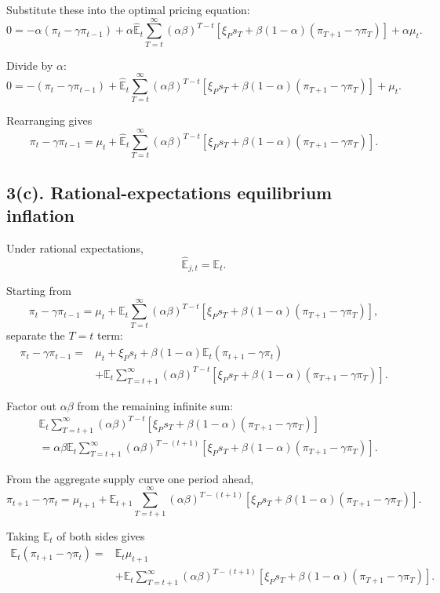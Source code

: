 \documentclass[12pt]{article}
\begin{document}
Substitute these into the optimal pricing equation:
\[
0
=
-\alpha(\pi_t-\gamma\pi_{t-1})
+
\alpha\hat{\mathbb{E}}_{t}
\sum_{T=t}^{\infty}
(\alpha\beta)^{T-t}
\left[
\xi_P s_T
+
\beta(1-\alpha)(\pi_{T+1}-\gamma\pi_T)
\right]
+
\alpha\mu_t.
\]

Divide by $\alpha$:
\[
0
=
-(\pi_t-\gamma\pi_{t-1})
+
\hat{\mathbb{E}}_{t}
\sum_{T=t}^{\infty}
(\alpha\beta)^{T-t}
\left[
\xi_P s_T
+
\beta(1-\alpha)(\pi_{T+1}-\gamma\pi_T)
\right]
+
\mu_t.
\]

Rearranging gives
\[
\boxed{
\pi_t-\gamma\pi_{t-1}
=
\mu_t
+
\hat{\mathbb{E}}_{t}
\sum_{T=t}^{\infty}
(\alpha\beta)^{T-t}
\left[
\xi_P s_T
+
\beta(1-\alpha)(\pi_{T+1}-\gamma\pi_T)
\right].
}
\]

\subsection*{3(c). Rational-expectations equilibrium inflation}

Under rational expectations,
\[
\hat{\mathbb{E}}_{j,t}=\mathbb{E}_t.
\]

Starting from
\[
\pi_t-\gamma\pi_{t-1}
=
\mu_t
+
\mathbb{E}_{t}
\sum_{T=t}^{\infty}
(\alpha\beta)^{T-t}
\left[
\xi_P s_T
+
\beta(1-\alpha)(\pi_{T+1}-\gamma\pi_T)
\right],
\]
separate the $T=t$ term:
\[
\begin{aligned}
\pi_t-\gamma\pi_{t-1}
=
&\mu_t
+
\xi_P s_t
+
\beta(1-\alpha)\mathbb{E}_t(\pi_{t+1}-\gamma\pi_t) \\
&+
\mathbb{E}_{t}
\sum_{T=t+1}^{\infty}
(\alpha\beta)^{T-t}
\left[
\xi_P s_T
+
\beta(1-\alpha)(\pi_{T+1}-\gamma\pi_T)
\right].
\end{aligned}
\]

Factor out $\alpha\beta$ from the remaining infinite sum:
\[
\begin{aligned}
&\mathbb{E}_{t}
\sum_{T=t+1}^{\infty}
(\alpha\beta)^{T-t}
\left[
\xi_P s_T
+
\beta(1-\alpha)(\pi_{T+1}-\gamma\pi_T)
\right] \\
&=
\alpha\beta
\mathbb{E}_{t}
\sum_{T=t+1}^{\infty}
(\alpha\beta)^{T-(t+1)}
\left[
\xi_P s_T
+
\beta(1-\alpha)(\pi_{T+1}-\gamma\pi_T)
\right].
\end{aligned}
\]

From the aggregate supply curve one period ahead,
\[
\pi_{t+1}-\gamma\pi_t
=
\mu_{t+1}
+
\mathbb{E}_{t+1}
\sum_{T=t+1}^{\infty}
(\alpha\beta)^{T-(t+1)}
\left[
\xi_P s_T
+
\beta(1-\alpha)(\pi_{T+1}-\gamma\pi_T)
\right].
\]

Taking $\mathbb{E}_t$ of both sides gives
\[
\begin{aligned}
\mathbb{E}_t(\pi_{t+1}-\gamma\pi_t)
=
&\mathbb{E}_t\mu_{t+1} \\
&+
\mathbb{E}_t
\sum_{T=t+1}^{\infty}
(\alpha\beta)^{T-(t+1)}
\left[
\xi_P s_T
+
\beta(1-\alpha)(\pi_{T+1}-\gamma\pi_T)
\right].
\end{aligned}
\]
\end{document}
